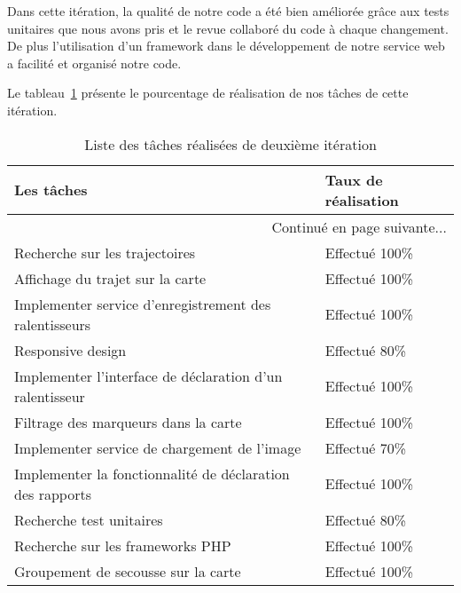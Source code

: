 Dans cette itération, la qualité de notre code a été bien améliorée grâce aux
tests unitaires que nous avons pris et le revue collaboré du code à chaque
changement. De plus l'utilisation d'un framework dans le développement de notre
service web a facilité et organisé notre code.

Le tableau~\ref{tab:sprint2-evaluation} présente le pourcentage de
réalisation de nos tâches de cette itération.
\begin{center}
    \begin{longtable}{| l | l |}
        \caption{Liste des tâches réalisées de deuxième itération}
\label{tab:sprint2-evaluation} \\

        \hline
        \textbf{Les tâches} & \textbf{Taux de réalisation} \\ \hline
        \endhead

        \hline \multicolumn{2}{|r|}{{Continué en page suivante$\dotsc$}} \\ \hline
        \endfoot

        \hline \hline
        \endlastfoot

        \hline
Recherche sur les trajectoires & Effectué 100\% \\ \hline
Affichage du trajet sur la carte & Effectué 100\% \\ \hline
Implementer service d'enregistrement des ralentisseurs & Effectué 100\% \\ \hline
Responsive design & Effectué 80\% \\ \hline
Implementer l'interface de déclaration d'un ralentisseur & Effectué 100\% \\ \hline
Filtrage des marqueurs dans la carte & Effectué 100\% \\ \hline
Implementer service de chargement de l'image & Effectué 70\% \\ \hline
Implementer la fonctionnalité de déclaration des rapports & Effectué 100\% \\ \hline
Recherche test unitaires & Effectué 80\% \\ \hline
Recherche sur les frameworks PHP & Effectué 100\% \\ \hline
Groupement de secousse sur la carte & Effectué 100\% \\ \hline
    \end{longtable}
\end{center}
